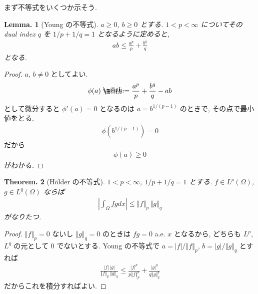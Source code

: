 \documentclass[openany, a4paper, oneside]{jsbook}
\makeatletter
\newcommand*{\defeq}{\mathrel{\rlap{%
\raisebox{0.3ex}{$\m@th\cdot$}}%
\raisebox{-0.3ex}{$\m@th\cdot$}}%
=}
\theoremstyle{break}
\theoremstyle{breakdefn}
\newtheorem{thm}{Theorem.}[section]
\newtheorem{lem}[thm]{Lemma.}
\newcommand{\abs}[1]{\left|#1\right|}
\newcommand{\norm}[1]{\left\Vert#1\right\Vert}
\newcommand{\rbk}[1]{\left (#1\right)}
\makeatother
\begin{document}
まず不等式をいくつか示そう.
\begin{lem}[Young の不等式]
 $a \ge 0$, $b \ge 0$ とする.
 $1 < p < \infty$ についてその dual index $q$ を $1/p + 1/q = 1$ となるように定めると,
 \begin{align}
  ab
  \le
  \frac{a^p}{p} + \frac{b^q}{q}
 \end{align}
 となる.
\end{lem}
\begin{proof}
$a$, $b \neq 0$ としてよい.
\begin{align}
 \phi(a)
 \defeq
 \frac{a^p}{p} + \frac{b^q}{q} -ab
\end{align}
として微分すると $\phi'(a) = 0$ となるのは $a = b^{1/{(p-1)}}$ のときで, その点で最小値をとる.
\begin{align}
 \phi \rbk{b^{1/{(p-1)}}}
 =
 0
\end{align}
だから
\begin{align}
 \phi(a) \ge 0
\end{align}
がわかる.
\end{proof}

\begin{thm}[H\"older の不等式]
 $1 < p < \infty$, $1/p + 1/q = 1$ とする.
 $f \in L^p(\Omega)$, $g \in L^q(\Omega)$
 ならば
 \begin{align}
  \abs{\int_{\Omega} fg dx}
  \leq
  \norm{f}_p \, \norm{g}_q
 \end{align}
 がなりたつ.
\end{thm}
\begin{proof}
$\norm{f}_p = 0$ ないし $\norm{g}_q = 0$ のときは $fg = 0$ a.e. $x$ となるから,
どちらも $L^p$, $L^q$ の元として $0$ でないとする.
Young の不等式で $a = \abs{f} / \norm{f}_p$, $b = \abs{g} / \norm{g}_q$ とすれば
\begin{align}
 \frac{\abs{f} \, \abs{g}}{\norm{f}_p \, \norm{g}_q}
 \le
 \frac{\abs{f}^p}{p \norm{f}_p^p} + \frac{\abs{g}^q}{q \norm{g}_q^q}
\end{align}
だからこれを積分すればよい.
\end{proof}
\end{document}

